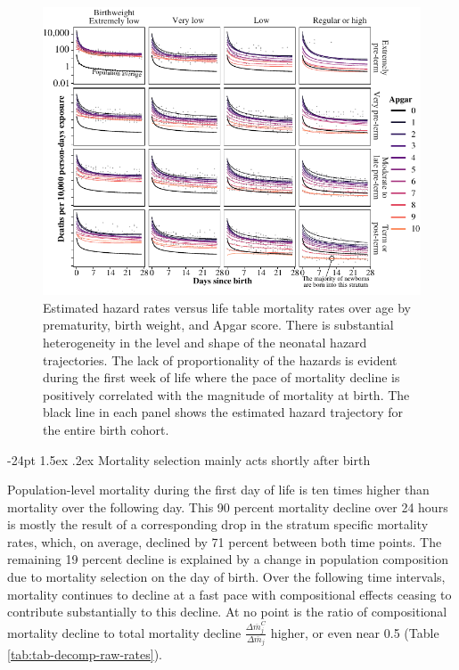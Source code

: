 \documentclass[10pt,twoside,reqno]{article}
\makeatletter
\def\cnstmaxfigwidth{
      \ifdim \Gin@nat@width>\linewidth
        \linewidth
      \else \Gin@nat@width
      \fi
    }
\let\Oldincludegraphics\includegraphics
\renewcommand{\includegraphics}[1]{\Oldincludegraphics[width=\cnstmaxfigwidth]{#1}}
\renewcommand\subsection{\@startsection{subsection}{2}{\z@}%
                                     {-24pt}%
                                     {1.5ex \@plus .2ex}%
                                     {\normalfont\normalsize\bfseries}}
\makeatother
\begin{document}
\begin{figure}
\centering
\includegraphics{fig/neonatal_hazard_trajectories.pdf}
\caption{\label{fig:neonatal-hazard-trajectories}Estimated hazard rates versus life table mortality rates over age by prematurity, birth weight, and Apgar score. There is substantial heterogeneity in the level and shape of the neonatal hazard trajectories. The lack of proportionality of the hazards is evident during the first week of life where the pace of mortality decline is positively correlated with the magnitude of mortality at birth. The black line in each panel shows the estimated hazard trajectory for the entire birth cohort.}
\end{figure}

\subsection{Mortality selection mainly acts shortly after birth}\label{mortality-selection-mainly-acts-shortly-after-birth}

Population-level mortality during the first day of life is ten times higher than mortality over the following day. This 90 percent mortality decline over 24 hours is mostly the result of a corresponding drop in the stratum specific mortality rates, which, on average, declined by 71 percent between both time points. The remaining 19 percent decline is explained by a change in population composition due to mortality selection on the day of birth. Over the following time intervals, mortality continues to decline at a fast pace with compositional effects ceasing to contribute substantially to this decline. At no point is the ratio of compositional mortality decline to total mortality decline \(\frac{\Delta \overline{m}_j^C}{\Delta \overline{m}_j}\) higher, or even near 0.5 (Table \ref{tab:tab-decomp-raw-rates}).
\end{document}
